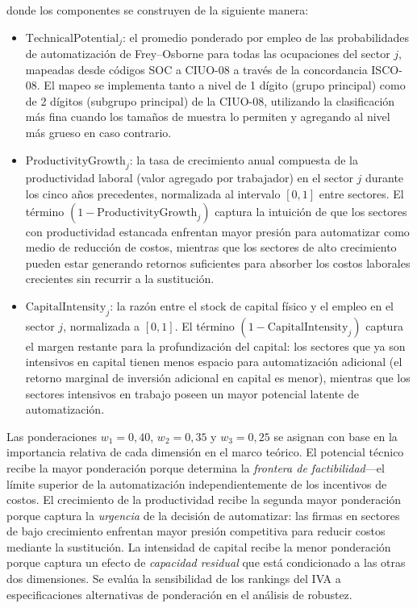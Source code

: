 \documentclass{article}
\begin{document}
\noindent donde los componentes se construyen de la siguiente manera:

\begin{itemize}[nosep]
\item $\text{TechnicalPotential}_j$: el promedio ponderado por empleo de las probabilidades de automatizaci\'on de Frey--Osborne para todas las ocupaciones del sector $j$, mapeadas desde c\'odigos SOC a CIUO-08 a trav\'es de la concordancia ISCO-08. El mapeo se implementa tanto a nivel de 1 d\'igito (grupo principal) como de 2 d\'igitos (subgrupo principal) de la CIUO-08, utilizando la clasificaci\'on m\'as fina cuando los tama\~nos de muestra lo permiten y agregando al nivel m\'as grueso en caso contrario.

\item $\text{ProductivityGrowth}_j$: la tasa de crecimiento anual compuesta de la productividad laboral (valor agregado por trabajador) en el sector $j$ durante los cinco a\~nos precedentes, normalizada al intervalo $[0, 1]$ entre sectores. El t\'ermino $(1 - \text{ProductivityGrowth}_j)$ captura la intuici\'on de que los sectores con productividad estancada enfrentan mayor presi\'on para automatizar como medio de reducci\'on de costos, mientras que los sectores de alto crecimiento pueden estar generando retornos suficientes para absorber los costos laborales crecientes sin recurrir a la sustituci\'on.

\item $\text{CapitalIntensity}_j$: la raz\'on entre el stock de capital f\'isico y el empleo en el sector $j$, normalizada a $[0, 1]$. El t\'ermino $(1 - \text{CapitalIntensity}_j)$ captura el margen restante para la profundizaci\'on del capital: los sectores que ya son intensivos en capital tienen menos espacio para automatizaci\'on adicional (el retorno marginal de inversi\'on adicional en capital es menor), mientras que los sectores intensivos en trabajo poseen un mayor potencial latente de automatizaci\'on.
\end{itemize}

Las ponderaciones $w_1 = 0,40$, $w_2 = 0,35$ y $w_3 = 0,25$ se asignan con base en la importancia relativa de cada dimensi\'on en el marco te\'orico. El potencial t\'ecnico recibe la mayor ponderaci\'on porque determina la \textit{frontera de factibilidad}---el l\'imite superior de la automatizaci\'on independientemente de los incentivos de costos. El crecimiento de la productividad recibe la segunda mayor ponderaci\'on porque captura la \textit{urgencia} de la decisi\'on de automatizar: las firmas en sectores de bajo crecimiento enfrentan mayor presi\'on competitiva para reducir costos mediante la sustituci\'on. La intensidad de capital recibe la menor ponderaci\'on porque captura un efecto de \textit{capacidad residual} que est\'a condicionado a las otras dos dimensiones. Se eval\'ua la sensibilidad de los rankings del IVA a especificaciones alternativas de ponderaci\'on en el an\'alisis de robustez.
\end{document}
